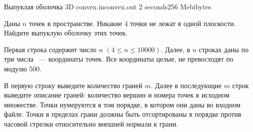 \begin{problem}{Выпуклая оболочка 3D}
{convex.in}{convex.out}
{2 seconds}{256 Mebibytes}


Даны $n$ точек в пространстве. Никакие 4 точки не лежат в одной плоскости.
Найдите выпуклую оболочку этих точек.

\InputFile

Первая строка содержит число $n$ $(4 \le n \le 10000)$. Далее, в $n$ строках даны по три числа 
~--- координаты точек. Все координаты целые, не превосходят по модулю 500.

\OutputFile

В первую строку выведите количество граней $m$. Далее в последующие $m$ строк выведите
описание граней: количество вершин и номера точек в исходном множестве. 
Точки нумеруются в том порядке, в котором они даны во входном файле. Точки в 
пределах грани должны быть отсортированы в порядке против часовой стрелки относительно
внешней нормали к грани.  

\Example

\begin{example}
%
\end{example}

\end{problem}
